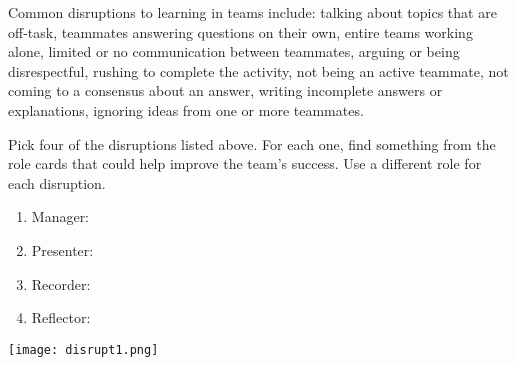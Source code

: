 

Common disruptions to learning in teams include:
  talking about topics that are off-task,
  teammates answering questions on their own,
  entire teams working alone,
  limited or no communication between teammates,
  arguing or being disrespectful,
  rushing to complete the activity,
  not being an active teammate,
  not coming to a consensus about an answer,
  writing incomplete answers or explanations,
  ignoring ideas from one or more teammates.




\Q Pick four of the disruptions listed above.
For each one, find something from the role cards that could help improve the team's success.
Use a different role for each disruption.

\begin{enumerate}
\item Manager: 
\vspace{2em}
\item Presenter: 
\vspace{2em}
\item Recorder: 
\vspace{2em}
\item Reflector: 
\vspace{2em}
\end{enumerate}

\begin{center}
\texttt{[image: disrupt1.png]}
\end{center}
